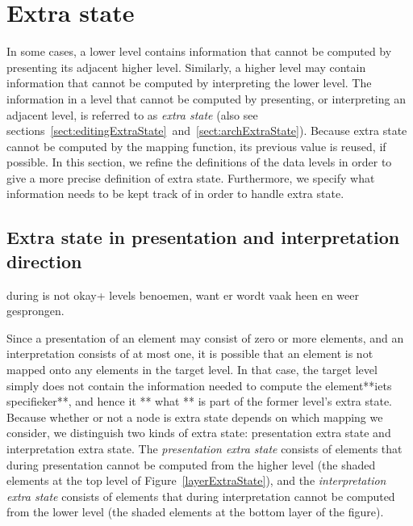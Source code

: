 %																
%																
%																
\section{Extra state} \label{sect:extraState}



In some cases, a lower level contains information that cannot be computed by presenting its adjacent higher level. Similarly, a higher level may contain information that cannot be computed by interpreting the lower level. The information in a level that cannot be computed by presenting, or interpreting an adjacent level, is referred to as {\em extra state} (also see sections~\ref{sect:editingExtraState}~and~\ref{sect:archExtraState}). Because extra state cannot be computed by the mapping function, its previous value is reused, if possible. In this section, we refine the definitions of the data levels in order to give a more precise definition of extra state. Furthermore, we specify what information needs to be kept track of in order to handle extra state.




%																
\subsection{Extra state in presentation and interpretation direction}

\bc
during is not okay+ levels benoemen, want er wordt vaak heen en weer gesprongen.

Since a presentation of an element may consist of zero or more elements, and an interpretation consists of at most one, it is possible that an element is not mapped onto any elements in the target level. In that case, the target level simply does not contain the information needed to compute the element**iets specifieker**, and hence it ** what ** is part of the former level's extra state. Because whether or not a node is extra state depends on which mapping we consider, we distinguish two kinds of extra state: presentation extra state and interpretation extra state. The {\em presentation extra state} consists of elements that during presentation cannot be computed from the higher level (the shaded elements at the top level of Figure~\ref{layerExtraState}), and the {\em interpretation extra state} consists of elements that during interpretation cannot be computed from the lower level (the shaded elements at the bottom layer of the figure).
\ec


